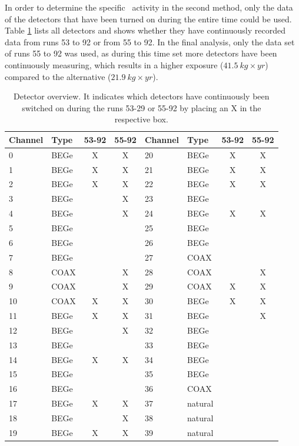 In order to determine the specific \Kr\ activity in the second method, only the data of the detectors that have been turned on during the entire time could be used.
Table \ref{tab:Detector} lists all detectors and shows whether they have continuously recorded data from runs 53 to 92 or from 55 to 92.
In the final analysis, only the data set of runs 55 to 92 was used, as during this time set more detectors have been continuously measuring, which results in a higher exposure ($41.5 \ \unit{kg}\times\unit{yr}$) compared to the alternative ($21.9 \ \unit{kg}\times\unit{yr}$).
\begin{table}
    \centering
	\begin{tabular}{|l|l|c|c||l|l|c|c|}
		\hline
		Channel & Type & 53-92 & 55-92 & Channel & Type & 53-92 & 55-92 \\
		\hline
		0 & BEGe & X & X & 20 & BEGe & X & X \\
		\hline
		1 & BEGe & X & X & 21 & BEGe & X & X \\
		\hline
		2 & BEGe & X & X & 22 & BEGe & X & X \\
		\hline
		3 & BEGe &  & X & 23 & BEGe &  &  \\
		\hline
		4 & BEGe &  & X & 24 & BEGe & X & X \\
		\hline
		5 & BEGe &  &  & 25 & BEGe &  &  \\
		\hline
		6 & BEGe &  &  & 26 & BEGe &  &  \\
		\hline
		7 & BEGe &  &  & 27 & COAX &  &  \\
		\hline
		8 & COAX &  & X & 28 & COAX &  & X \\
		\hline
		9 & COAX &  & X & 29 & COAX & X & X \\
		\hline
		10 & COAX & X & X & 30 & BEGe & X & X \\
		\hline
		11 & BEGe & X & X & 31 & BEGe &  & X \\
		\hline
		12 & BEGe &  & X & 32 & BEGe &  &  \\
		\hline
		13 & BEGe &  &  & 33 & BEGe &  &  \\
		\hline
		14 & BEGe & X & X & 34 & BEGe & &  \\
		\hline
		15 & BEGe &  &  & 35 & BEGe &  &  \\
		\hline
		16 & BEGe &  &  & 36 & COAX &  &  \\
		\hline
		17 & BEGe & X & X & 37 & natural &  &  \\
		\hline
		18 & BEGe &  & X & 38 & natural &  &  \\
		\hline
		19 & BEGe & X & X & 39 & natural &  &  \\
		\hline
	\end{tabular}
	\caption{Detector overview. It indicates which detectors have continuously been switched on during the runs 53-29 or 55-92 by placing an X in the respective box.}
	\label{tab:Detector}
\end{table}


